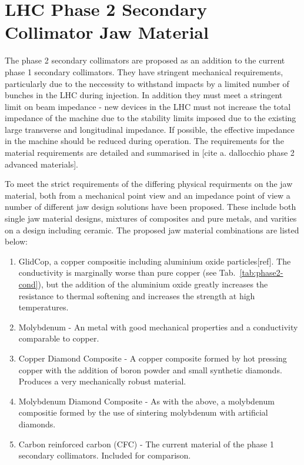 \section{LHC Phase 2 Secondary Collimator Jaw Material}
\label{sec:phase-2-col-mat}

The phase 2 secondary collimators are proposed as an addition to the current phase 1 secondary collimators. They have stringent mechanical requirements, particularly due to the neccessity to withstand impacts by a limited number of bunches in the LHC during injection. In addition they must meet a stringent limit on beam impedance - new devices in the LHC must not increase the total impedance of the machine due to the stability limits imposed due to the existing large transverse and longitudinal impedance. If possible, the effective impedance in the machine should be reduced during operation. The requirements for the material requirements are detailed and summarised in [cite a. dallocchio phase 2 advanced materials].

To meet the strict requirements of the differing physical requirments on the jaw material, both from a mechanical point view and an impedance point of view a number of different jaw design solutions have been proposed. These include both single jaw material designs, mixtures of composites and pure metals, and varities on a design including ceramic. The proposed jaw material combinations are listed below:

\begin{enumerate}
\item{GlidCop, a copper compositie including aluminium oxide particles[ref]. The conductivity is marginally worse than pure copper (see Tab.~\ref{tab:phase2-cond}), but the addition of the aluminium oxide greatly increases the resistance to thermal softening and increases the strength at high temperatures.}
\item{Molybdenum - An metal with good mechanical properties and a conductivity comparable to copper.}
\item{Copper Diamond Composite - A copper composite formed by hot pressing copper with the addition of boron powder and small synthetic diamonds. Produces a very mechanically robust material.}
\item{Molybdenum Diamond Composite - As with the above, a molybdenum compositie formed by the use of sintering molybdenum with artificial diamonds.}
\item{Carbon reinforced carbon (CFC) - The current material of the phase 1 secondary collimators. Included for comparison.}
\end{enumerate}


